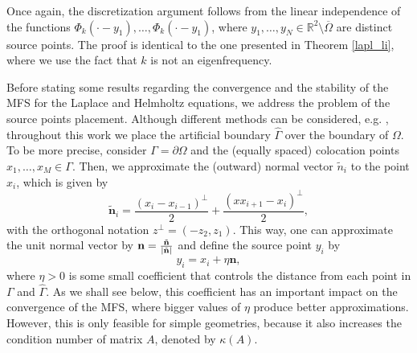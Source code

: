 Once again, the discretization argument follows from the linear independence of the functions \(\Phi_k(\cdot-y_1),\dots,\Phi_k(\cdot-y_1)\), where \(y_1,\dots,y_N \in \mathbb{R}^2\setminus\overline{\Omega}\) are distinct source points. The proof is identical to the one presented in Theorem \ref{lapl_li}, where we use the fact that \(k\) is not an eigenfrequency.

Before stating some results regarding the convergence and the stability of the \ac{MFS} for the Laplace and Helmholtz equations, we address the problem of the source points placement. Although different methods can be considered, e.g. \cite{alves2009choice}, throughout this work we place the artificial boundary \(\hat{\Gamma}\) over the boundary of \(\Omega\). To be more precise, consider \(\Gamma = \partial \Omega\) and the (equally spaced) colocation points \(x_1,\dots,x_M \in \Gamma\). Then, we approximate the (outward) normal vector \(\tilde{n}_i\) to the point \(x_i\), which is given by
\[
    \tilde{\mathbf{n}}_i = \frac{(x_i - x_{i-1})^\perp }{2} + \frac{(xx_{i+1}-x_i)^\perp }{2},
\]
with the orthogonal notation \(z^\perp = (-z_2,z_1)\). This way, one can approximate the unit normal vector by \(\mathbf{n} = \frac{\tilde{\mathbf{n}}}{\abs{\tilde{\mathbf{n}}}}\) and define the source point \(y_i\) by
\[
    y_i = x_i + \eta \mathbf{n},
\]
where \(\eta>0\) is some small coefficient that controls the distance from each point in \(\Gamma\) and \(\hat{\Gamma}\). As we shall see below, this coefficient has an important impact on the convergence of the \ac{MFS}, where bigger values of \(\eta\) produce better approximations. However, this is only feasible for simple geometries, because it also increases the condition number of matrix \(A\), denoted by \(\kappa(A)\).

